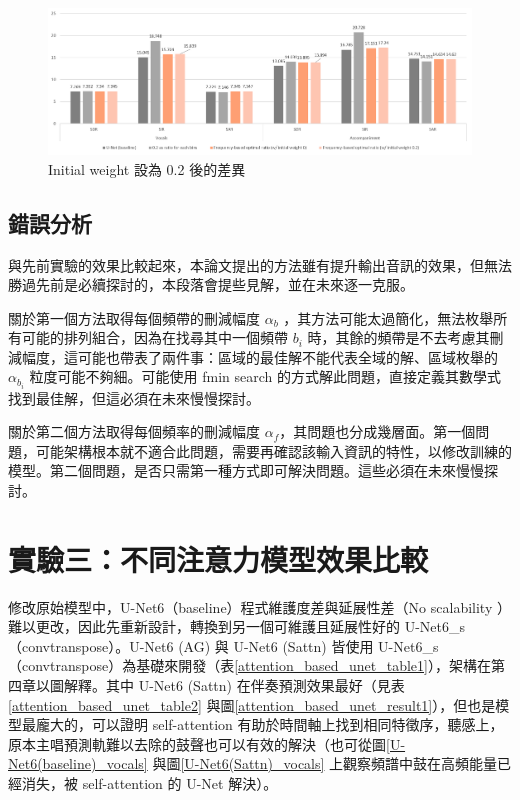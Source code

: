 \begin{figure}[htbp]
    \hfil
    \begin{minipage}[t]{1.0\textwidth}
        \includegraphics[width=\textwidth]{./figures/chapter05_result/magnitude_subtraction_method_result3.png}
        \caption {Initial weight 設為 0.2 後的差異}
        \label{magnitude_subtraction_method_result3}
    \end{minipage}
    \hfil
\end{figure}

\subsection*{錯誤分析}
與先前實驗的效果比較起來，本論文提出的方法雖有提升輸出音訊的效果，但無法勝過先前是必續探討的，本段落會提些見解，並在未來逐一克服。

關於第一個方法取得每個頻帶的刪減幅度 $\alpha_b$ ，其方法可能太過簡化，無法枚舉所有可能的排列組合，因為在找尋其中一個頻帶 $b_i$ 時，其餘的頻帶是不去考慮其刪減幅度，這可能也帶表了兩件事：區域的最佳解不能代表全域的解、區域枚舉的 $\alpha_{b_i}$ 粒度可能不夠細。可能使用 fmin search 的方式解此問題，直接定義其數學式找到最佳解，但這必須在未來慢慢探討。

關於第二個方法取得每個頻率的刪減幅度 $\alpha_f$，其問題也分成幾層面。第一個問題，可能架構根本就不適合此問題，需要再確認該輸入資訊的特性，以修改訓練的模型。第二個問題，是否只需第一種方式即可解決問題。這些必須在未來慢慢探討。

\clearpage

\section{實驗三：不同注意力模型效果比較}
修改原始模型中，U-Net6（baseline）程式維護度差與延展性差（No scalability ）難以更改，因此先重新設計，轉換到另一個可維護且延展性好的 U-Net6\_s（convtranspose）。U-Net6 (AG) 與 U-Net6 (Sattn) 皆使用 U-Net6\_s（convtranspose）為基礎來開發（表\ref{attention_based_unet_table1}），架構在第四章以圖解釋。其中 U-Net6 (Sattn) 在伴奏預測效果最好（見表\ref{attention_based_unet_table2} 與圖\ref{attention_based_unet_result1}），但也是模型最龐大的，可以證明 self-attention 有助於時間軸上找到相同特徵序，聽感上，原本主唱預測軌難以去除的鼓聲也可以有效的解決（也可從圖\ref{U-Net6(baseline)_vocals} 與圖\ref{U-Net6(Sattn)_vocals} 上觀察頻譜中鼓在高頻能量已經消失，被 self-attention 的 U-Net 解決）。

